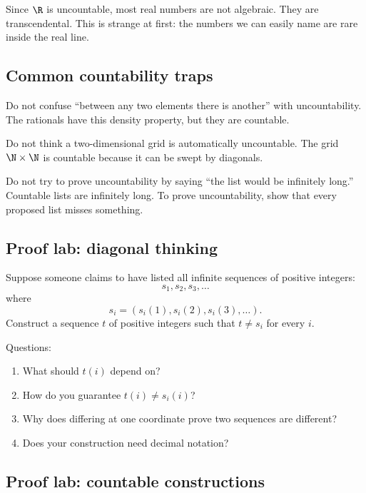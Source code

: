 Since $\R$ is uncountable, most real numbers are not algebraic. They are transcendental. This is strange at first: the numbers we can easily name are rare inside the real line.

\subsection{Common countability traps}

\begin{trapbox}
Do not confuse ``between any two elements there is another'' with uncountability. The rationals have this density property, but they are countable.
\end{trapbox}

\begin{trapbox}
Do not think a two-dimensional grid is automatically uncountable. The grid $\N\times\N$ is countable because it can be swept by diagonals.
\end{trapbox}

\begin{trapbox}
Do not try to prove uncountability by saying ``the list would be infinitely long.'' Countable lists are infinitely long. To prove uncountability, show that every proposed list misses something.
\end{trapbox}

\subsection{Proof lab: diagonal thinking}

\begin{labbox}
Suppose someone claims to have listed all infinite sequences of positive integers:
\[
s_1,s_2,s_3,\ldots
\]
where
\[
s_i=(s_i(1),s_i(2),s_i(3),\ldots).
\]
Construct a sequence $t$ of positive integers such that $t\neq s_i$ for every $i$.

Questions:
\begin{enumerate}
\item What should $t(i)$ depend on?
\item How do you guarantee $t(i)\neq s_i(i)$?
\item Why does differing at one coordinate prove two sequences are different?
\item Does your construction need decimal notation?
\end{enumerate}
\end{labbox}

\subsection{Proof lab: countable constructions}

